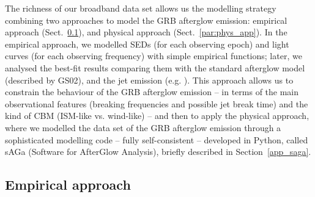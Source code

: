 \documentclass{aa}
\begin{document}
The richness of our broadband data set allows us the modelling strategy combining two approaches to model the GRB afterglow emission: empirical approach (Sect.~\ref{par:emp_app}), and physical approach (Sect.~\ref{par:phys_app}).
In the empirical approach, we modelled SEDs (for each observing epoch) and light curves (for each observing frequency) with simple empirical functions; later, we analysed the best-fit results comparing them with the standard afterglow model (described by GS02), and the jet emission (e.g. \citealt{Panaitescu98,Rhoads99,Sari99b,Panaitescu02,Sari06,Granot07}).
This approach allows us to constrain the behaviour of the GRB afterglow emission -- in terms of the main observational features (breaking frequencies and possible jet break time) and the kind of CBM (ISM-like vs. wind-like) -- and then to apply the physical approach, where we modelled the data set of the GRB afterglow emission through a sophisticated modelling code -- fully self-consistent -- developed in Python, called {\sc sAGa} (Software for AfterGlow Analysis), briefly described in Section~\ref{app_saga}.


\subsection{Empirical approach}
\label{par:emp_app}
\end{document}
